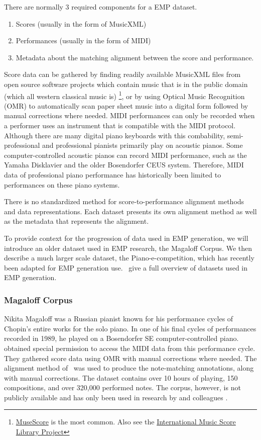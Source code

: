 There are normally 3 required components for a EMP dataset. 
\begin{enumerate}
    \item Scores (usually in the form of MusicXML)
    \item Performances (usually in the form of MIDI)
    \item Metadata about the matching alignment between the score and performance. 
\end{enumerate}
Score data can be gathered by finding readily available MusicXML files from open source software projects which contain music that is in the public domain (which all western classical music is) \footnote{\href{https://musescore.com}{MuseScore} is the most common. Also see the \href{https://imslp.org/wiki/Main_Page}{International Music Score Library Project}}, or by using Optical Music Recognition (OMR) to automatically scan paper sheet music into a digital form followed by manual corrections where needed. MIDI performances can only be recorded when a performer uses an instrument that is compatible with the MIDI protocol. Although there are many digital piano keyboards with this combability, semi-professional and professional pianists primarily play on acoustic pianos. Some computer-controlled acoustic pianos can record MIDI performance, such as the Yamaha Disklavier and the older Bosendorfer CEUS system. Therefore, MIDI data of professional piano performance has historically been limited to performances on these piano systems. 

There is no standardized method for score-to-performance alignment methods and data representations. Each dataset presents its own alignment method as well as the metadata that represents the alignment. 

To provide context for the progression of data used in EMP generation, we will introduce an older dataset used in EMP research, the Magaloff Corpus. We then describe a much larger scale dataset, the Piano-e-competition, which has recently been adapted for EMP generation use.~\citet{cancino2018computational} give a full overview of datasets used in EMP generation. 

\subsubsection{Magaloff Corpus}
Nikita Magaloff was a Russian pianist known for his performance cycles of Chopin's entire works for the solo piano. In one of his final cycles of performances recorded in 1989, he played on a Bosendorfer SE computer-controlled piano.~\citet{flossmann2010magaloff} obtained special permission to access the MIDI data from this performance cycle. They gathered score data using OMR with manual corrections where needed.  The alignment method of~\citet{grachten2006expressivity} was used to produce the note-matching annotations, along with manual corrections. The dataset contains over 10 hours of playing, 150 compositions, and over 320,000 performed notes. The corpus, however, is not publicly available and has only been used in research by \citet{flossmann2010magaloff} and colleagues \cite{eduardo2018computational}. 

